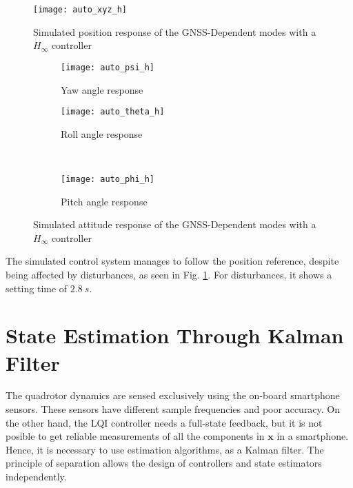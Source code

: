 \begin{figure}[h]
	\begin{center}
	\texttt{[image: auto\_xyz\_h]}
	\caption{Simulated position response of the GNSS-Dependent modes with a $H_\infty$ controller}
	\label{fig:auto_xyz_h}
	\end{center}
	\end{figure}
\begin{figure}[H]
\begin{subfigure}{.5\linewidth}
\centering
\texttt{[image: auto\_psi\_h]}
\caption{Yaw angle response}
\label{fig:auto_psi_h}
\end{subfigure}%
\begin{subfigure}{.5\linewidth}
\centering
\texttt{[image: auto\_theta\_h]}
\caption{Roll angle response}
\label{fig:auto_theta_h}
\end{subfigure}\\[1ex]
\begin{subfigure}{\linewidth}
\centering
\texttt{[image: auto\_phi\_h]}
\caption{Pitch angle response}
\label{fig:auto_psi_h}
\end{subfigure}
\caption{Simulated attitude response of the GNSS-Dependent modes with a $H_\infty$ controller}
\label{fig:auto_h}
\end{figure}
The simulated control system manages to follow the position reference, despite being affected by disturbances, as seen in Fig. \ref{fig:auto_xyz_h}. For disturbances, it shows a setting time of $2.8\ s$.

\section{State Estimation Through Kalman Filter}
\label{sec:stateestimation}
The quadrotor dynamics are sensed exclusively using the on-board smartphone sensors. These sensors have different sample frequencies and poor accuracy. On the other hand, the LQI controller needs a full-state feedback, but it is not posible to get reliable measurements of all the components in $\mathbf{x}$ in a smartphone. Hence, it is necessary to use estimation algorithms, as a Kalman filter. The principle of separation allows the design of controllers and state estimators independently.

